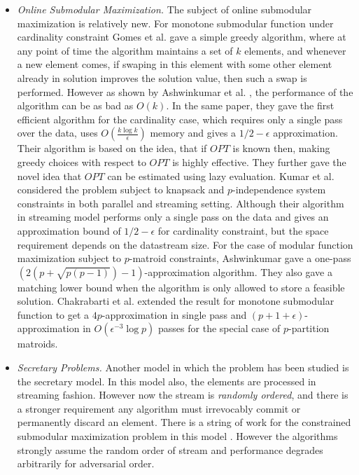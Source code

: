 \documentclass[oneside,letterpaper]{scrartcl} \usepackage{macros}
\begin{document}
\begin{itemize}
\item \textit{Online Submodular Maximization.} The subject of online
  submodular maximization is relatively new. For monotone submodular
  function under cardinality constraint Gomes et al. \cite{gk-10} gave
  a simple greedy algorithm, where at any point of time the algorithm
  maintains a set of $k$ elements, and whenever a new element comes,
  if swaping in this element with some other element already in
  solution improves the solution value, then such a swap is
  performed. However as shown by Ashwinkumar et
  al. \cite{bmkk-sso-14}, the performance of the algorithm can be as
  bad as $O(k)$. In the same paper, they gave the first efficient
  algorithm for the cardinality case, which requires only a single
  pass over the data, uses $O(\frac{k\log k}{\epsilon})$ memory and
  gives a $1/2 - \epsilon$ approximation.  Their algorithm is based on
  the idea, that if $OPT$ is known then, making greedy choices with
  respect to $OPT$ is highly effective. They further gave the novel
  idea that $OPT$ can be estimated using lazy evaluation. Kumar et
  al. \cite{kmvv-13} considered the problem subject to knapsack and
  $p$-independence system constraints in both parallel and streaming
  setting. Although their algorithm in streaming model performs only a
  single pass on the data and gives an approximation bound of $1/2 -
  \epsilon$ for cardinality constraint, but the space requirement
  depends on the datastream size. For the case of modular function
  maximization subject to $p$-matroid constraints, Ashwinkumar
  \cite{abv-11} gave a one-pass $(2(p + \sqrt{p(p - 1)}) -
  1)$-approximation algorithm. They also gave a matching lower bound
  when the algorithm is only allowed to store a feasible
  solution. Chakrabarti et al. extended the result for monotone
  submodular function to get a $4p$-approximation in single pass and
  $(p+1+\epsilon)$-approximation in $O(\epsilon^{-3} \log p)$ passes
  for the special case of $p$-partition matroids.

\item \textit{Secretary Problems.} Another model in which the problem
  has been studied is the secretary model. In this model also, the
  elements are processed in streaming fashion. However now the stream
  is \textit{randomly ordered}, and there is a stronger requirement
  any algorithm must irrevocably commit or permanently discard an
  element. There is a string of work for the constrained submodular
  maximization problem in this model
  \cite{bik-07,bdgit-09,kp-09,grst-10}. However the algorithms
  strongly assume the random order of stream and performance degrades
  arbitrarily for adversarial order.
\end{itemize}
\fi
\end{document}
